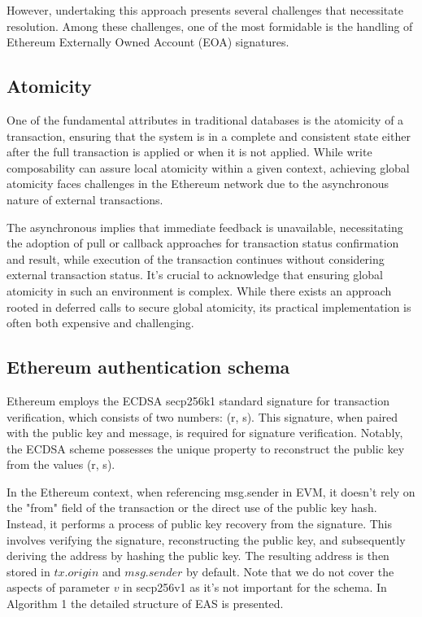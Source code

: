 However, undertaking this approach presents several challenges that necessitate resolution. 
Among these challenges, one of the most formidable is the handling of 
Ethereum Externally Owned Account (EOA) signatures. 

\subsection{Atomicity}

One of the fundamental attributes in traditional databases is the atomicity of a transaction, 
ensuring that the system is in a complete and consistent state either after the full 
transaction is applied or when it is not applied. While write composability can assure local 
atomicity within a given context, achieving global atomicity faces challenges in the Ethereum 
network due to the asynchronous nature of external transactions.

The asynchronous implies that immediate feedback is unavailable, necessitating the adoption of 
pull or callback approaches for transaction status confirmation and result, while execution of 
the transaction continues without considering external transaction status. It's crucial to 
acknowledge that ensuring global atomicity in such an environment is complex. While there exists 
an approach rooted in deferred calls to secure global atomicity, its practical implementation 
is often both expensive and challenging.


\subsection{Ethereum authentication schema}
Ethereum employs the ECDSA secp256k1 standard signature for transaction verification, 
which consists of two numbers: (r, s). This signature, when paired with the public key 
and message, is required for signature verification. Notably, the ECDSA scheme possesses 
the unique property to reconstruct the public key from the values (r, s). 

In the Ethereum context, when referencing msg.sender in EVM, it doesn't rely on the 
"from" field of the transaction or the direct use of the public key hash. Instead, it performs 
a process of public key recovery from the signature. This involves verifying the signature, 
reconstructing the public key, and subsequently deriving the address by hashing the public key. 
The resulting address is then stored in \(tx.origin\) and \(msg.sender\) by default. Note 
that we do not cover the aspects of parameter $v$ in secp256v1 as it's not important for the schema.
In Algorithm 1 the detailed structure of EAS is presented.

